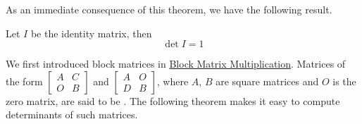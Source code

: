 \documentclass{ximera}
\begin{document}
As an immediate consequence of this theorem, we have the following result.

\begin{corollary}\label{lemma:detofid} Let $I$ be the identity matrix, then
 $$\det{I}=1$$
 \end{corollary}

 We first introduced block matrices in \href{\xmbaseurl/MAT-0023/main}{Block Matrix Multiplication}.  Matrices of the form $\begin{bmatrix}A & C\\O& B\end{bmatrix}$ and $\begin{bmatrix}A & O\\D& B\end{bmatrix}$, where $A$, $B$ are square matrices and $O$ is the zero matrix, are said to be .  The following theorem makes it easy to compute determinants of such matrices.
\end{document}
